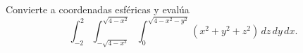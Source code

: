 Convierte a coordenadas esféricas y evalúa
\[
\int_{-2}^2\int_{-\sqrt{4-x^2}}^{\sqrt{4-x^2}}
\int_0^{\sqrt{4-x^2-y^2}}
(x^2+y^2+z^2)\,dz\,dy\,dx.
\]
    